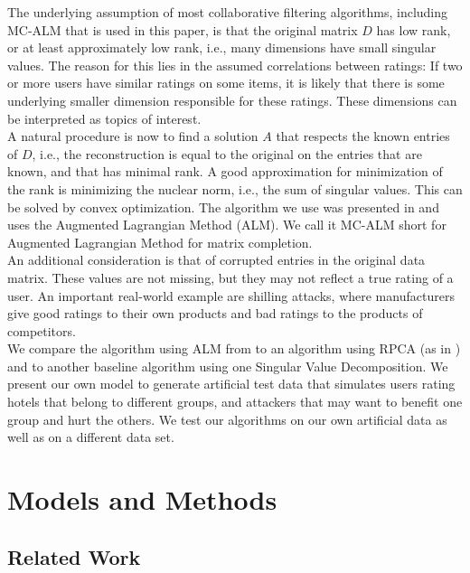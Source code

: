 \documentclass[10pt,conference,compsocconf]{IEEEtran}
\begin{document}
The underlying assumption of most collaborative filtering algorithms, including MC-ALM that is used in this paper,
is that the original matrix $D$ has low rank, or at least approximately low rank, i.e., many dimensions have small singular values. 
The reason for this lies in the assumed correlations between ratings:
If two or more users have similar ratings on some items, it is likely that there is some underlying smaller
dimension responsible for these ratings. These dimensions can be interpreted as topics of interest. \\

A natural procedure is now to find a solution $A$ that respects the known entries of $D$, i.e., the reconstruction is equal 
to the original on the entries that are known, and that has minimal rank. A good approximation for minimization
of the rank is minimizing the nuclear norm, i.e., the sum of singular values. This can be solved by convex optimization. 
The algorithm we use was presented in \cite{almpaper} and uses the Augmented Lagrangian Method (ALM). We call it MC-ALM short for Augmented Lagrangian Method for matrix completion. \\

An additional consideration is that of corrupted entries in the original data matrix. These values are not missing,
but they may not reflect a true rating of a user. An important real-world example are shilling attacks, where manufacturers
give good ratings to their own products and bad ratings to the products of competitors. \\

We compare the algorithm using ALM from \cite{almpaper} to an algorithm using RPCA (as in \cite{rpcapaper}) and to another baseline algorithm using one Singular Value Decomposition. We present our own model to generate artificial test data that simulates users rating hotels that belong to different groups, and attackers that may want to benefit one group and hurt the others. We test our algorithms on our own artificial data as well as on a different data set.

\section{Models and Methods}

\subsection{Related Work}
\end{document}
